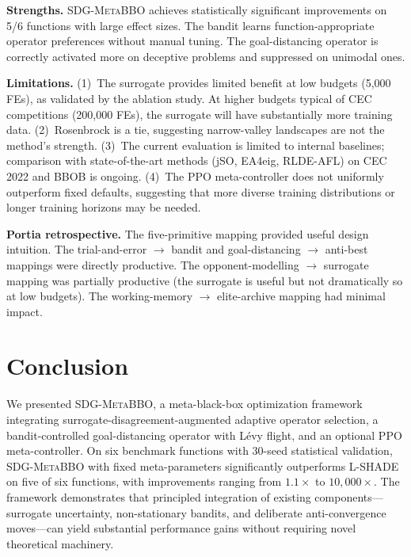 \documentclass[preprint,12pt,authoryear]{elsarticle}
\newcommand{\sdg}{\textsc{SDG-MetaBBO}}
\begin{document}
\textbf{Strengths.} \sdg{} achieves statistically significant improvements on 5/6 functions with large effect sizes. The bandit learns function-appropriate operator preferences without manual tuning. The goal-distancing operator is correctly activated more on deceptive problems and suppressed on unimodal ones.

\textbf{Limitations.} (1)~The surrogate provides limited benefit at low budgets (5{,}000 FEs), as validated by the ablation study. At higher budgets typical of CEC competitions (200{,}000 FEs), the surrogate will have substantially more training data. (2)~Rosenbrock is a tie, suggesting narrow-valley landscapes are not the method's strength. (3)~The current evaluation is limited to internal baselines; comparison with state-of-the-art methods (jSO, EA4eig, RLDE-AFL) on CEC\,2022 and BBOB is ongoing. (4)~The PPO meta-controller does not uniformly outperform fixed defaults, suggesting that more diverse training distributions or longer training horizons may be needed.

\textbf{Portia retrospective.} The five-primitive mapping provided useful design intuition. The trial-and-error $\to$ bandit and goal-distancing $\to$ anti-best mappings were directly productive. The opponent-modelling $\to$ surrogate mapping was partially productive (the surrogate is useful but not dramatically so at low budgets). The working-memory $\to$ elite-archive mapping had minimal impact.

\section{Conclusion}
\label{sec:conclusion}

We presented \sdg{}, a meta-black-box optimization framework integrating surrogate-disagreement-augmented adaptive operator selection, a bandit-controlled goal-distancing operator with L\'evy flight, and an optional PPO meta-controller. On six benchmark functions with 30-seed statistical validation, \sdg{} with fixed meta-parameters significantly outperforms L-SHADE on five of six functions, with improvements ranging from $1.1\times$ to $10{,}000\times$. The framework demonstrates that principled integration of existing components---surrogate uncertainty, non-stationary bandits, and deliberate anti-convergence moves---can yield substantial performance gains without requiring novel theoretical machinery.
\end{document}
